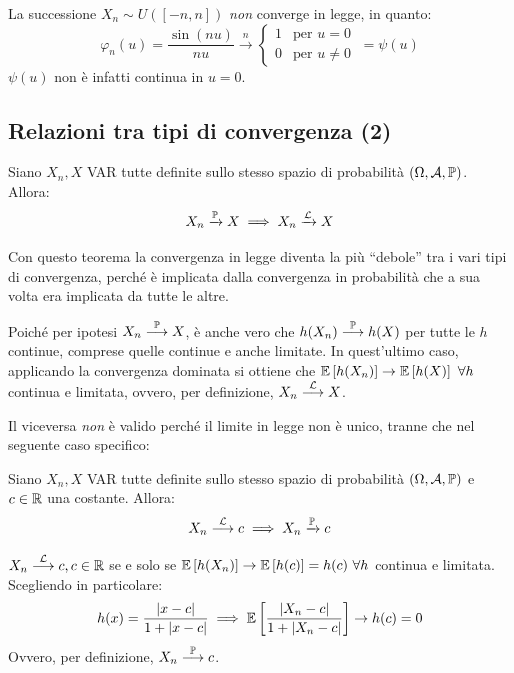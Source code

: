 \medskip
\begin{cese}
  La successione $X_n \sim U([-n,n])$ \emph{non} converge in legge, in quanto:
  $$\varphi_n(u) = \frac{\sin(nu)}{nu} \stackrel{n}{\longrightarrow}
  \begin{cases}
    1 & \text{per } u = 0 \\
    0 & \text{per } u \neq 0
  \end{cases}
  \ = \psi(u)$$
  $\psi(u)$ non è infatti continua in $u = 0$.
\end{cese}

\subsection{Relazioni tra tipi di convergenza (2)}
\begin{teob}[\JPTh{18.2}]
  Siano $X_n, X$ VAR tutte definite sullo stesso spazio di probabilità $(\Omega, \mathcal A, \mathbb P)$.
  Allora:
  $$X_n \xrightarrow{\mathbb P} X \implies X_n \xrightarrow{\mathcal L} X$$
\end{teob}
Con questo teorema la convergenza in legge diventa la più ``debole'' tra i vari tipi di convergenza, perché è implicata dalla convergenza in probabilità che a sua volta era implicata da tutte le altre.

\begin{dimo}
  Poiché per ipotesi $X_n \stackrel{\mathbb P}{\longrightarrow} X$, è anche vero che $h(X_n) \stackrel{\mathbb P}{\longrightarrow} h(X)$ per tutte le $h$ continue, comprese quelle continue e anche limitate.
  In quest'ultimo caso, applicando la convergenza dominata si ottiene che $\mathbb E \left[ h(X_n) \right] \to \mathbb E \left[ h(X) \right] \ \forall h$ continua e limitata, ovvero, per definizione, $X_n \stackrel{\mathcal L}{\longrightarrow} X$.
\end{dimo}

Il viceversa \emph{non} è valido perché il limite in legge non è unico, tranne che nel seguente caso specifico:
\begin{teob}[\JPTh{18.3}]\label{conv-costante}
  Siano $X_n, X$ VAR tutte definite sullo stesso spazio di probabilità $(\Omega, \mathcal A, \mathbb P)$ e $c \in \mathbb R$ una costante.
  Allora:
  $$X_n \stackrel{\mathcal L}{\longrightarrow} c \implies X_n \xrightarrow{\mathbb P} c$$
\end{teob}

\begin{dimo}
  $X_n \stackrel{\mathcal L}{\longrightarrow} c, c \in \mathbb R$ se e solo se
  $\mathbb E \left[ h(X_n) \right] \to \mathbb E \left[ h(c) \right] = h(c) \ \forall h$ continua e limitata.
  Scegliendo in particolare:
  $$h(x) = \frac{|x-c|}{1+|x-c|} \implies \mathbb E \left[  \frac{|X_n - c|}{1+|X_n - c|}  \right] \to h(c) = 0$$
  Ovvero, per definizione, $X_n \stackrel{\mathbb P}{\longrightarrow} c$.
\end{dimo}

